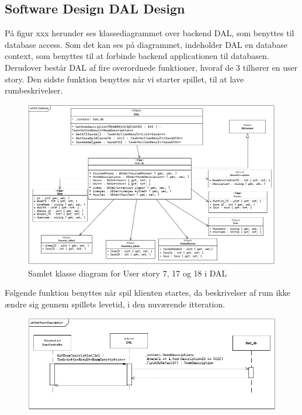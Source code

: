 \subsection{Software Design DAL Design}
På figur xxx herunder ses klassediagrammet over backend DAL, som benyttes til database access. 
Som det kan ses på diagrammet, indeholder DAL en database context, som benyttes til at forbinde backend applicationen til databasen. 
Derudover består DAL af fire overordnede funktioner, hvoraf de 3 tilhører en user story. 
Den sidste funktion benyttes når vi starter spillet, til at lave rumbeskrivelser.\\

\begin{figure}[H]
\centering
\includegraphics[width = \textwidth]{02-Body/Images/DAL-Database/DAL-DB-CD.PNG}
\caption{Samlet klasse diagram for User story 7, 17 og 18 i DAL}
\label{fig:DAL-Sekvens-7-17-18}
\end{figure}

Følgende funktion benyttes når spil klienten startes, da beskrivelser af rum ikke ændre sig gennem spillets levetid, i den nuværende itteration.\\

\begin{figure}[H]
\centering
\includegraphics[width = \textwidth]{02-Body/Images/DAL-Database/RoomDescriptionSd.PNG}
\caption{}
\label{fig:DAL-Sekvens-7-17-18}
\end{figure}


